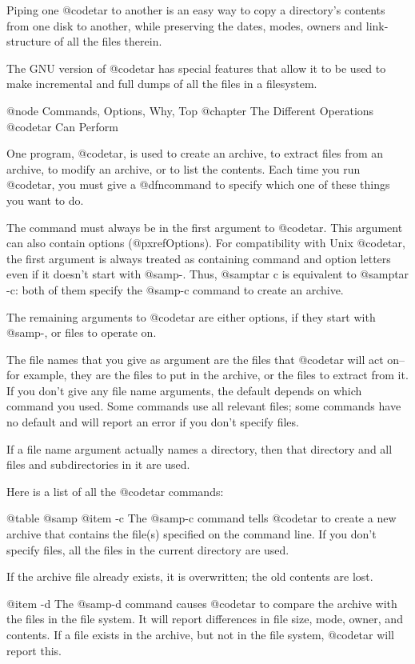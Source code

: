 Piping one @code{tar} to another is an easy way to copy a directory's
contents from one disk to another, while preserving the dates, modes, owners
and link-structure of all the files therein.

The GNU version of @code{tar} has special features that allow it to be
used to make incremental and full dumps of all the files in a
filesystem.

@node Commands, Options, Why, Top
@chapter The Different Operations @code{tar} Can Perform

One program, @code{tar}, is used to create an archive, to extract files
from an archive, to modify an archive, or to list the contents.  Each
time you run @code{tar}, you must give a @dfn{command} to specify which
one of these things you want to do.

The command must always be in the first argument to @code{tar}.  This
argument can also contain options (@pxref{Options}).  For compatibility
with Unix @code{tar}, the first argument is always treated as containing
command and option letters even if it doesn't start with @samp{-}.  Thus,
@samp{tar c} is equivalent to @samp{tar -c}: both of them specify the
@samp{-c} command to create an archive.

The remaining arguments to @code{tar} are either options, if they start
with @samp{-}, or files to operate on.

The file names that you give as argument are the files that @code{tar} will
act on--for example, they are the files to put in the archive, or the files
to extract from it.  If you don't give any file name arguments, the default
depends on which command you used.  Some commands use all relevant files;
some commands have no default and will report an error if you don't specify
files.

If a file name argument actually names a directory, then that directory
and all files and subdirectories in it are used.

Here is a list of all the @code{tar} commands:

@table @samp
@item -c
The @samp{-c} command tells @code{tar} to create a new archive that
contains the file(s) specified on the command line.  If you don't
specify files, all the files in the current directory are used.

If the archive file already exists, it is overwritten; the old contents
are lost.

@item -d
The @samp{-d} command causes @code{tar} to compare the archive with
the files in the file system.  It will report differences in file
size, mode, owner, and contents.  If a file exists in the archive, but
not in the file system, @code{tar} will report this.

